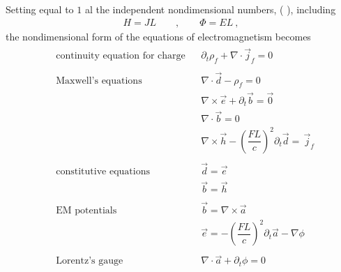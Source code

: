 \documentclass[letterpaper,10pt,english]{jupyterBook}
\begin{document}
\sphinxAtStartPar
Setting equal to \(1\) al the independent non\sphinxhyphen{}dimensional numbers, ( ), including
\begin{equation*}
\begin{split}H = JL \qquad , \qquad \Phi = E L \ ,\end{split}
\end{equation*}
\sphinxAtStartPar
the non\sphinxhyphen{}dimensional form of the equations of electromagnetism becomes
\begin{equation}\label{equation:ch/regimes-non-dimensional:eq:em:non-dimensional}
\begin{split}
\begin{aligned}
  & \text{continuity equation for charge}        &&  \partial_t \rho_f +  \nabla \cdot \vec{j}_f = 0 \\ \\
  & \text{Maxwell's equations}                   &&  \nabla \cdot \vec{d} - \rho_f = 0 \\
  &                                              &&  \nabla \times \vec{e} +  \partial_t \vec{b} = \vec{0} \\ 
  &                                              &&  \nabla \cdot \vec{b} = 0 \\
  &                                              &&  \nabla \times \vec{h} - \left(\dfrac{FL}{c}\right)^2 \partial_t \vec{d} = \, \vec{j}_f  \\ \\
  & \text{constitutive equations}                &&  \vec{d} = \vec{e} \\
  &                                              &&  \vec{b} = \vec{h} \\ \\
  & \text{EM potentials}                         &&  \vec{b} = \nabla \times \vec{a} \\
  &                                              &&  \vec{e} = - \left( \dfrac{FL}{c} \right)^2 \partial_t \vec{a} - \nabla \phi \\ \\
  & \text{Lorentz's gauge}                       &&  \nabla \cdot \vec{a} + \partial_t \phi = 0
\end{aligned}
\end{split}
\end{equation}
\sphinxAtStartPar
{} 
\end{document}
